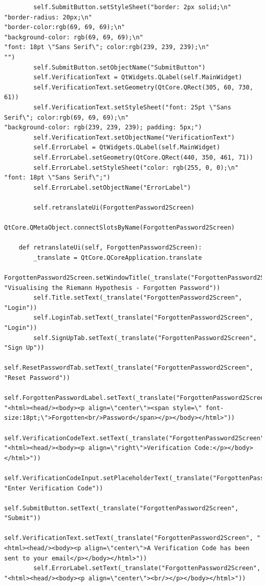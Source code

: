 \documentclass{article}
\begin{document}
\begin{lstlisting}
        self.SubmitButton.setStyleSheet("border: 2px solid;\n"
"border-radius: 20px;\n"
"border-color:rgb(69, 69, 69);\n"
"background-color: rgb(69, 69, 69);\n"
"font: 18pt \"Sans Serif\"; color:rgb(239, 239, 239);\n"
"")
        self.SubmitButton.setObjectName("SubmitButton")
        self.VerificationText = QtWidgets.QLabel(self.MainWidget)
        self.VerificationText.setGeometry(QtCore.QRect(305, 60, 730, 61))
        self.VerificationText.setStyleSheet("font: 25pt \"Sans Serif\"; color:rgb(69, 69, 69);\n"
"background-color: rgb(239, 239, 239); padding: 5px;")
        self.VerificationText.setObjectName("VerificationText")
        self.ErrorLabel = QtWidgets.QLabel(self.MainWidget)
        self.ErrorLabel.setGeometry(QtCore.QRect(440, 350, 461, 71))
        self.ErrorLabel.setStyleSheet("color: rgb(255, 0, 0);\n"
"font: 18pt \"Sans Serif\";")
        self.ErrorLabel.setObjectName("ErrorLabel")

        self.retranslateUi(ForgottenPassword2Screen)
        QtCore.QMetaObject.connectSlotsByName(ForgottenPassword2Screen)

    def retranslateUi(self, ForgottenPassword2Screen):
        _translate = QtCore.QCoreApplication.translate
        ForgottenPassword2Screen.setWindowTitle(_translate("ForgottenPassword2Screen", "Visualising the Riemann Hypothesis - Forgotten Password"))
        self.Title.setText(_translate("ForgottenPassword2Screen", "Login"))
        self.LoginTab.setText(_translate("ForgottenPassword2Screen", "Login"))
        self.SignUpTab.setText(_translate("ForgottenPassword2Screen", "Sign Up"))
        self.ResetPasswordTab.setText(_translate("ForgottenPassword2Screen", "Reset Password"))
        self.ForgottenPasswordLabel.setText(_translate("ForgottenPassword2Screen", "<html><head/><body><p align=\"center\"><span style=\" font-size:18pt;\">Forgotten<br/>Password</span></p></body></html>"))
        self.VerificationCodeText.setText(_translate("ForgottenPassword2Screen", "<html><head/><body><p align=\"right\">Verification Code:</p></body></html>"))
        self.VerificationCodeInput.setPlaceholderText(_translate("ForgottenPassword2Screen", "Enter Verification Code"))
        self.SubmitButton.setText(_translate("ForgottenPassword2Screen", "Submit"))
        self.VerificationText.setText(_translate("ForgottenPassword2Screen", "<html><head/><body><p align=\"center\">A Verification Code has been sent to your email</p></body></html>"))
        self.ErrorLabel.setText(_translate("ForgottenPassword2Screen", "<html><head/><body><p align=\"center\"><br/></p></body></html>"))
\end{lstlisting}
\end{document}
